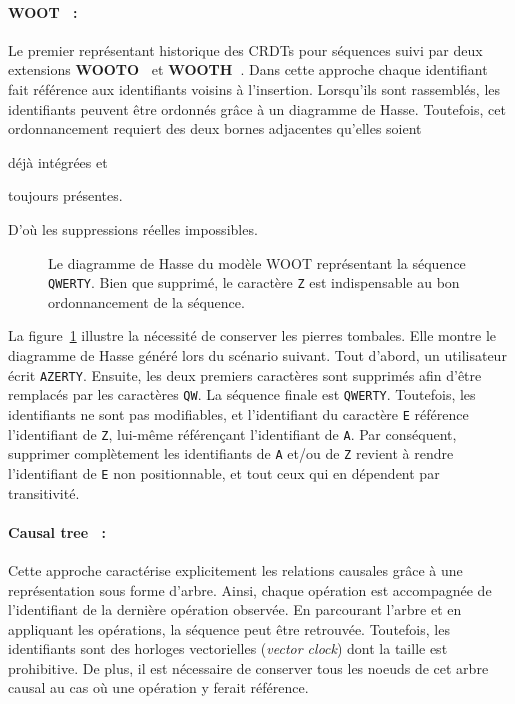 \paragraph{WOOT~\cite{oster2006data} :} Le premier représentant historique des
CRDTs pour séquences suivi par deux extensions
\textbf{WOOTO~\cite{weiss2007wooki}} et
\textbf{WOOTH~\cite{ahmed2011evaluating}}. Dans cette approche chaque
identifiant fait référence aux identifiants voisins à l'insertion.  Lorsqu'ils
sont rassemblés, les identifiants peuvent être ordonnés grâce à un diagramme de
Hasse. Toutefois, cet ordonnancement requiert des deux bornes adjacentes
qu'elles soient
\begin{inparaenum}[(i)]
\item déjà intégrées et
\item toujours présentes.
\end{inparaenum}
D'où les suppressions réelles impossibles.

\begin{figure}
  \centering
  
  \caption[Diagramme de Hasse dans WOOT]
  {\label{repl:fig:wootexample}Le diagramme de Hasse du modèle WOOT représentant
    la séquence \texttt{QWERTY}. Bien que supprimé, le caractère \texttt{Z} est
    indispensable au bon ordonnancement de la séquence.}
\end{figure}

\noindent La figure~\ref{repl:fig:wootexample} illustre la nécessité de
conserver les pierres tombales. Elle montre le diagramme de Hasse généré lors du
scénario suivant. Tout d'abord, un utilisateur écrit \texttt{AZERTY}. Ensuite,
les deux premiers caractères sont supprimés afin d'être remplacés par les
caractères \texttt{QW}. La séquence finale est \texttt{QWERTY}. Toutefois, les
identifiants ne sont pas modifiables, et l'identifiant du caractère \texttt{E}
référence l'identifiant de \texttt{Z}, lui-même référençant l'identifiant de
\texttt{A}. Par conséquent, supprimer complètement les identifiants de
\texttt{A} et/ou de \texttt{Z} revient à rendre l'identifiant de \texttt{E} non
positionnable, et tout ceux qui en dépendent par transitivité.

\paragraph{Causal tree~\cite{grishchenko2010deep} :} Cette approche caractérise
explicitement les relations causales grâce à une représentation sous forme
d'arbre. Ainsi, chaque opération est accompagnée de l'identifiant de la dernière
opération observée. En parcourant l'arbre et en appliquant les opérations, la
séquence peut être retrouvée. Toutefois, les identifiants sont des horloges
vectorielles (\emph{vector clock}) dont la taille est prohibitive. De plus, il
est nécessaire de conserver tous les noeuds de cet arbre causal au cas où une
opération y ferait référence.

